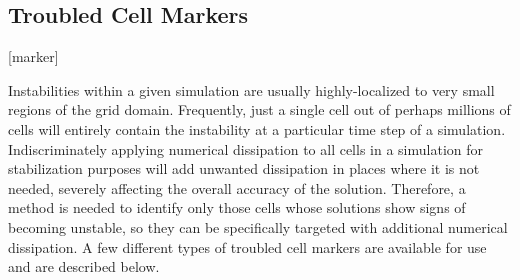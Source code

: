 \subsection{Troubled Cell Markers}%
\label{SEC:Markers}%
[marker]%





Instabilities within a given simulation are usually highly-localized
to very small regions of the grid domain.
%
Frequently, just a single cell out of perhaps millions of cells will
entirely contain the instability at a particular time step of a simulation.
%
Indiscriminately applying numerical dissipation to all cells in a
simulation for stabilization purposes will add unwanted dissipation
in places where it is not needed, severely affecting the overall accuracy
of the solution.
%
Therefore, a method is needed to identify only those cells whose
solutions show signs of becoming unstable, so they can be specifically
targeted with additional numerical dissipation.
%
A few different types of troubled cell markers are available for use
and are described below.


















